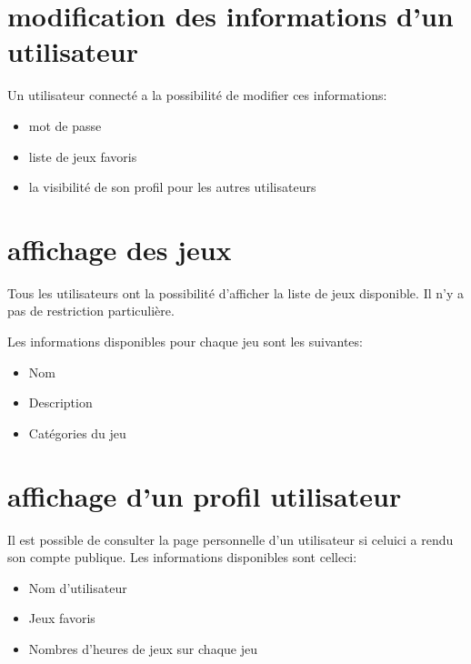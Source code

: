 \documentclass[a4paper,12pt,french]{sphinxmanual}
\begin{document}
\section{modification des informations d’un utilisateur}
\label{\detokenize{fonctionnelleWeb:modification-des-informations-dun-utilisateur}}
\sphinxAtStartPar
Un utilisateur connecté a la possibilité de modifier ces informations:
\begin{itemize}
\item {} 
\sphinxAtStartPar
mot de passe

\item {} 
\sphinxAtStartPar
liste de jeux favoris

\item {} 
\sphinxAtStartPar
la visibilité de son profil pour les autres utilisateurs

\end{itemize}






\section{affichage des jeux}
\label{\detokenize{fonctionnelleWeb:affichage-des-jeux}}
\sphinxAtStartPar
Tous les utilisateurs ont la possibilité d’afficher la liste de jeux disponible. Il n’y a pas de restriction particulière.

\sphinxAtStartPar
Les informations disponibles pour chaque jeu sont les suivantes:
\begin{itemize}
\item {} 
\sphinxAtStartPar
Nom

\item {} 
\sphinxAtStartPar
Description

\item {} 
\sphinxAtStartPar
Catégories du jeu

\end{itemize}






\section{affichage d’un profil utilisateur}
\label{\detokenize{fonctionnelleWeb:affichage-dun-profil-utilisateur}}
\sphinxAtStartPar
Il est possible de consulter la page personnelle d’un utilisateur si celui\sphinxhyphen{}ci a rendu son compte publique. Les informations disponibles sont celle\sphinxhyphen{}ci:
\begin{itemize}
\item {} 
\sphinxAtStartPar
Nom d’utilisateur

\item {} 
\sphinxAtStartPar
Jeux favoris

\item {} 
\sphinxAtStartPar
Nombres d’heures de jeux sur chaque jeu

\end{itemize}
\end{document}
